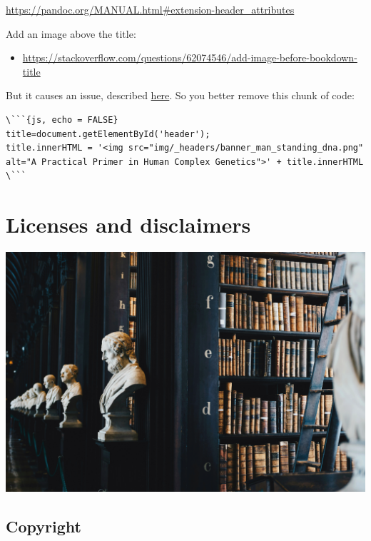 \documentclass[
]{book}
\providecommand{\tightlist}{%
  \setlength{\itemsep}{0pt}\setlength{\parskip}{0pt}}
\begin{document}
\url{https://pandoc.org/MANUAL.html\#extension-header_attributes}

Add an image above the title:

\begin{itemize}
\tightlist
\item
  \url{https://stackoverflow.com/questions/62074546/add-image-before-bookdown-title}
\end{itemize}

But it causes an issue, described \href{https://www.mobileread.com/forums/showthread.php?t=206086}{here}. So you better remove this chunk of code:

\begin{lstlisting}
\```{js, echo = FALSE}
title=document.getElementById('header');
title.innerHTML = '<img src="img/_headers/banner_man_standing_dna.png" alt="A Practical Primer in Human Complex Genetics">' + title.innerHTML
\```
\end{lstlisting}

\hypertarget{license}{%
\chapter{Licenses and disclaimers}\label{license}}

\includegraphics[width=1\textwidth,height=\textheight]{img/_headers/licenses.png}

\hypertarget{copyright}{%
\section{Copyright}\label{copyright}}
\end{document}
